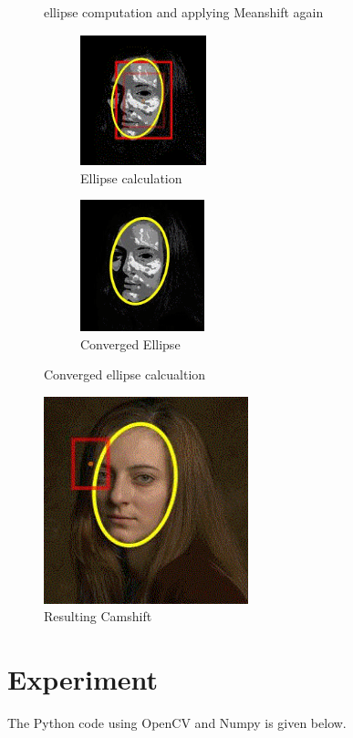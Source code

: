 \documentclass[11pt,a4paper]{article}
\begin{document}
\begin{itemize}
\begin{figure}[h!]
 \caption{ellipse computation and applying Meanshift again}
\end{figure}
 \begin{figure}[h!]
 \begin{subfigure}{0.5\textwidth}
\includegraphics[width=0.9\linewidth, height=3.8cm]{msec.png} 
\caption{Ellipse calculation}
\end{subfigure}
\begin{subfigure}{0.5\textwidth}
\includegraphics[width=0.9\linewidth, height=3.8cm]{convergedellipse.png}
\caption{Converged Ellipse}
\end{subfigure}
 \caption{Converged ellipse calcualtion}
\end{figure}

  \begin{figure}[h!]
 \includegraphics[width=0.9\linewidth, height=6cm]{result.png}
   \centering
 \caption{Resulting Camshift}
  \end{figure}

\end{itemize}	
 \newpage
 
\section{Experiment}
	The Python code using OpenCV and Numpy is given below.
	\newline
	\newline
	
\end{document}

